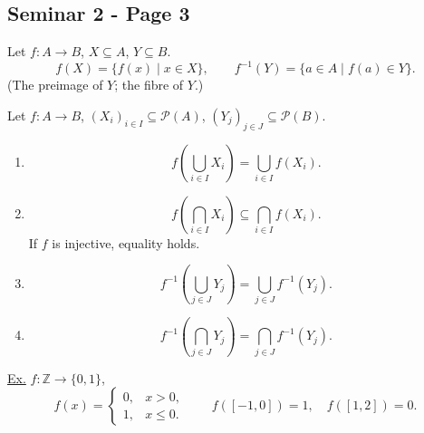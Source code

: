 
\subsection*{Seminar 2 - Page 3}

\noindent{}\quad Let $f:A\longrightarrow B$, $X\subseteq A$, $Y\subseteq B$.
\[
 f(X)=\{f(x)\mid x\in X\}, \qquad
 f^{-1}(Y)=\{a\in A\mid f(a)\in Y\}.
\]
\noindent (The preimage of $Y$; the fibre of $Y$.)

\medskip
\noindent Let $f:A\longrightarrow B$,
$(X_i)_{i\in I}\subseteq\mathcal{P}(A)$,
$(Y_j)_{j\in J}\subseteq\mathcal{P}(B)$.
\begin{enumerate}
\item[a)]
\[
 f\left(\bigcup_{i\in I}X_i\right)
  =\bigcup_{i\in I}f(X_i).
\]
\item[b)]
\[
 f\left(\bigcap_{i\in I}X_i\right)
  \subseteq\bigcap_{i\in I}f(X_i).
\]
\noindent If $f$ is injective, equality holds.
\item[c)]
\[
 f^{-1}\left(\bigcup_{j\in J}Y_j\right)
  =\bigcup_{j\in J}f^{-1}(Y_j).
\]
\item[d)]
\[
 f^{-1}\left(\bigcap_{j\in J}Y_j\right)
  =\bigcap_{j\in J}f^{-1}(Y_j).
\]
\end{enumerate}

\noindent\underline{Ex.} $f:\mathbb Z\longrightarrow\{0,1\}$,
\[
 f(x)=\begin{cases}
  0, & x>0,\\
  1, & x\leq 0.
 \end{cases}
 \qquad
 f([-1,0])=1,\quad f([1,2])=0.
\]

